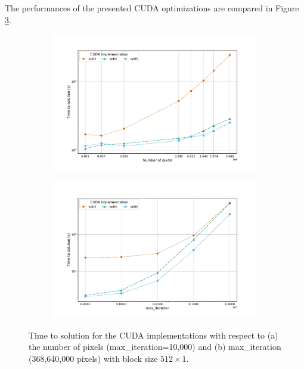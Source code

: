 \documentclass[11pt,a4paper]{article}
\begin{document}
\noindent
The performances of the presented CUDA optimizations are compared in Figure \ref{fig:cuda-optis}.\\[-7pt]
\begin{figure}[t]
	\vspace{-0.7cm}
	\centering
	\begin{subfigure}{.5\textwidth}
		\centering
		\includegraphics[width=.99\linewidth, clip, trim={1.5cm 1cm 2.5cm 2cm}]{cuda-optis-px.pdf}
		\caption{} 
		\label{fig:cuda-optis-px}
	\end{subfigure}%
	\begin{subfigure}{.5\textwidth}
		\centering
		\includegraphics[width=.99\linewidth, clip, trim={1.5cm 1cm 2.5cm 2cm}]{cuda-optis-maxiter.pdf}
		\caption{} 
		\label{fig:cuda-optis-maxiter}
	\end{subfigure}
	\vspace{-0.4cm}
	\caption{Time to solution for the CUDA implementations with respect to (a) the number of pixels (max\_iteration=10,000) and (b) max\_iteration (368,640,000 pixels) with block size $512\times1$.}
	\label{fig:cuda-optis}
\vspace{0.3cm}
\end{figure}
\end{document}
